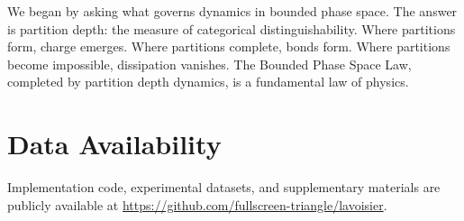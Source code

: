 \documentclass[twocolumn,10pt,a4paper]{article}
\theoremstyle{definition}
\theoremstyle{remark}
\begin{document}
We began by asking what governs dynamics in bounded phase space. The answer is partition depth: the measure of categorical distinguishability. Where partitions form, charge emerges. Where partitions complete, bonds form. Where partitions become impossible, dissipation vanishes. The Bounded Phase Space Law, completed by partition depth dynamics, is a fundamental law of physics.

\section*{Data Availability}

Implementation code, experimental datasets, and supplementary materials are publicly available at \url{https://github.com/fullscreen-triangle/lavoisier}.





\end{document}
